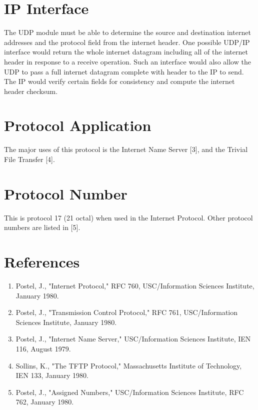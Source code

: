 \documentclass[11pt]{article}
\begin{document}
\section{IP Interface}
\label{sec:org878c1ba}


The UDP module  must be able to determine  the  source  and  destination
internet addresses and the protocol field from the internet header.  One
possible  UDP/IP  interface  would return  the whole  internet  datagram
including all of the internet header in response to a receive operation.
Such an interface  would  also allow  the UDP to pass  a  full  internet
datagram  complete  with header  to the IP to send.  The IP would verify
certain fields for consistency and compute the internet header checksum.

\section{Protocol Application}
\label{sec:org77186c9}

The major uses of this protocol is the Internet Name Server [3], and the
Trivial File Transfer [4].

\section{Protocol Number}
\label{sec:org71da479}

This is protocol  17 (21 octal)  when used  in  the  Internet  Protocol.
Other protocol numbers are listed in [5].

\section{References}
\label{sec:org10c97fa}

\begin{enumerate}
\item Postel,   J.,   "Internet  Protocol,"  RFC 760,  USC/Information
Sciences Institute, January 1980.

\item Postel,    J.,   "Transmission   Control   Protocol,"   RFC 761,
USC/Information Sciences Institute, January 1980.

\item Postel,  J.,  "Internet  Name Server,"  USC/Information Sciences
Institute, IEN 116, August 1979.

\item Sollins,  K.,  "The TFTP Protocol,"  Massachusetts  Institute of
Technology, IEN 133, January 1980.

\item Postel,   J.,   "Assigned   Numbers,"  USC/Information  Sciences
Institute, RFC 762, January 1980.
\end{enumerate}
\end{document}
